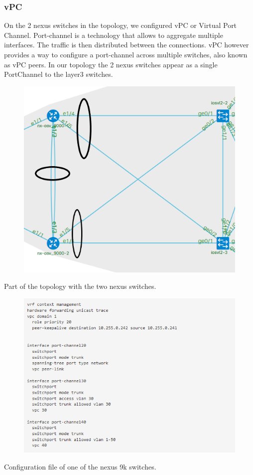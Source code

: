 \documentclass{article}
\begin{document}
\newpage
\subsubsection{vPC}
On the 2 nexus switches in the topology, we configured vPC or Virtual Port Channel.
Port-channel is a technology that allows to aggregate multiple interfaces.
The traffic is then distributed between the connections.
vPC however provides a way to configure a port-channel across multiple switches, also known as vPC peers.
In our topology the 2 nexus switches appear as a single PortChannel to the layer3 switches.

\begin{figure}[H]
	\centering
	\includegraphics[width=\textwidth]{images/vPC.png}
\end{figure}

Part of the topology with the two nexus switches.

\begin{figure}[H]
	\centering
	\includegraphics[width=\textwidth]{images/vPC_Config.png}
\end{figure}
Configuration file of one of the nexus 9k switches.
\end{document}
